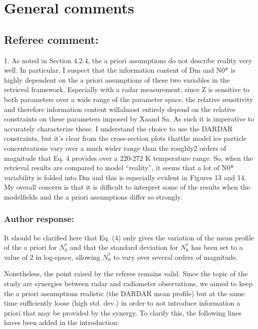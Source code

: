 \documentclass[11pt]{scrartcl}
\author{simon}
\date{\today}
\title{}
\begin{document}
\setlength{\parindent}{0cm}

\section*{General comments}

\subsection{Referee comment:}

1. As noted in Section 4.2.4, the a priori assumptions do not describe reality
very well. In particular, I suspect that the information content of Dm and N0* is
highly dependent on the a priori assumptions of these two variables in the
retrieval framework. Especially with a radar measurement, since Z is sensitive to
both parameters over a wide range of the parameter space, the relative
sensitivity and therefore information content willalmost entirely depend on the
relative constraints on these parameters imposed by Xaand Sa. As such it is
imperative to accurately characterize these. I understand the choice to use the
DARDAR constraints, but it’s clear from the cross-section plots thatthe model
ice particle concentrations vary over a much wider range than the roughly2
orders of magnitude that Eq. 4 provides over a 220-272 K temperature range.
So, when the retrieval results are compared to model “reality”, it seems that a
lot of N0* variability is folded into Dm and this is especially evident in
Figures 13 and 14. My overall concern is that it is difficult to interpret some
of the results when the modelfields and the a priori assumptions differ so
strongly.

\subsubsection*{Author response:}

It should be clarified here that Eq. (4) only gives the variation of the mean
profile of the a priori for $N_0^*$ and that the standard deviation for $N_0^*$
has been set to a value of $2$ in log-space, allowing $N_0^*$ to vary over several
orders of magnitude.

Nonetheless, the point raised by the referee remains valid. Since the topic
of the study are synergies between radar and radiometer observations, we aimed
to keep the a priori assumptions realistic (the DARDAR mean profile) but at the
same time sufficiently loose (high std. dev.) in order to not introduce information
a priori that may be provided by the synergy. To clarify this, the following
lines haves been added in the introduction:
\end{document}
